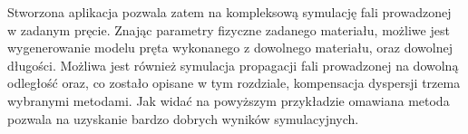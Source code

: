 Stworzona aplikacja pozwala zatem na kompleksową symulację fali prowadzonej w zadanym pręcie. Znając parametry fizyczne zadanego materiału, możliwe jest wygenerowanie modelu pręta wykonanego z dowolnego materiału, oraz dowolnej długości. Możliwa jest również symulacja propagacji fali prowadzonej na dowolną odległość oraz, co zostało opisane w tym rozdziale, kompensacja dyspersji trzema wybranymi metodami. Jak widać na powyższym przykładzie omawiana metoda pozwala na uzyskanie bardzo dobrych wyników symulacyjnych.